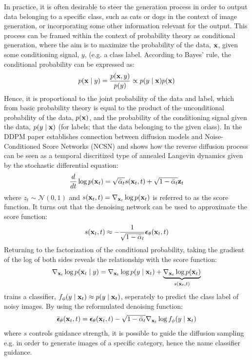 In practice, it is often desirable to steer the generation process in order to output data belonging to a specific class, such as cats or dogs in the context of image generation, or incorporating some other information relevant for the output. This process can be framed within the context of probability theory as conditional generation, where the aim is to maximize the probability of the data, $\boldsymbol{\mathbf{x}}$, given some conditioning signal, $y$, (e.g. a class label. According to Bayes' rule, the conditional probability can be expressed as:
\begin{equation}
    p(\boldsymbol{\mathbf{x}} \mid y) = \frac{p(\boldsymbol{\mathbf{x}}, y)}{p(y)} \propto p(y \mid \boldsymbol{\mathbf{x}}) p(\boldsymbol{\mathbf{x}})
\end{equation}
Hence, it is proportional to the joint probability of the data and label, which from basic probability theory is equal to the product of the unconditional probability of the data, $p(\boldsymbol{\mathbf{x}})$, and the probability of the conditioning signal given the data, $p(y \mid \boldsymbol{\mathbf{x}})$ (for labels; that the data belonging to the given class). In the DDPM paper \cite{ho2020denoising} establishes connection between diffusion models and Noise-Conditioned Score Networks (NCSN) and shows how the reverse diffusion process can be seen as a temporal discritized type of annealed Langevin dynamics given by the stochastic differential equation:
\begin{equation}
    \frac{d}{dt} \log p(\boldsymbol{\mathbf{x}}_t) = \sqrt{\bar{\alpha}_t} s(\boldsymbol{\mathbf{x}}_t, t) + \sqrt{1 - \bar{\alpha}_t} \boldsymbol{\mathbf{z}}_t
\end{equation}
where $z_t \sim \mathcal{N}(0, 1)$ and $s(\boldsymbol{\mathbf{x}}_t, t) = \nabla_{\boldsymbol{\mathbf{x}}_t} \log p(\boldsymbol{\mathbf{x}}_t)$ is referred to as the score function. It turns out that the denoising network can be used to approximate the score function:
\begin{equation}
    s(\boldsymbol{\mathbf{x}}_t, t) \approx -\frac{1}{\sqrt{1 - \bar{\alpha}_t}} \boldsymbol{\mathbf{\epsilon}}_\theta(\boldsymbol{\mathbf{x}}_t, t)
\end{equation}
Returning to the factorization of the conditional probability, taking the gradient of the log of both sides reveals the relationship with the score function:
\begin{equation}
    \nabla_{\boldsymbol{\mathbf{x}}_t} \log p(\boldsymbol{\mathbf{x}}_t \mid y ) = \nabla_{\boldsymbol{\mathbf{x}}_t} \log p(y \mid \boldsymbol{\mathbf{x}}_t) + \underbrace{\nabla_{\boldsymbol{\mathbf{x}}_t} \log p(\boldsymbol{\mathbf{x}}_t)}_{s(\boldsymbol{\mathbf{x}}_t, t)}
\end{equation}
\cite{dharial2021diffusion} trains a classifier, $f_\phi(y \mid \boldsymbol{\mathbf{x}}_t) \approx p(y \mid \boldsymbol{\mathbf{x}}_t)$, seperately to predict the class label of noisy images. By using the reformulated denoising function:
\begin{equation}
    \bar{\boldsymbol{\mathbf{\epsilon}}}_{\theta}(\boldsymbol{\mathbf{x}}_t, t) = \boldsymbol{\mathbf{\epsilon}}_\theta(\boldsymbol{\mathbf{x}}_t, t) - \sqrt{1 - \bar{\alpha}_t} \nabla_{\boldsymbol{\mathbf{x}}_t} \log f_\phi(y \mid \boldsymbol{\mathbf{x}}_t)
\end{equation}
where $s$ controls guidance strength, it is possible to guide the diffusion sampling e.g. in order to generate images of a specific category, hence the name classifier guidance. 



